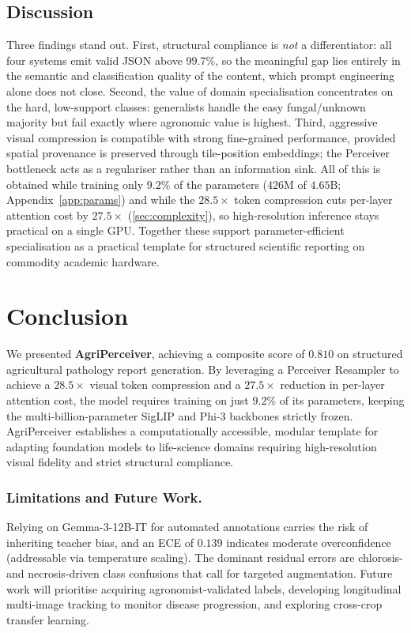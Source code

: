 \documentclass[runningheads]{llncs}
\newcommand{\ours}{AgriPerceiver}
\begin{document}
\subsection{Discussion}
Three findings stand out. First, structural compliance is \emph{not} a
differentiator: all four systems emit valid JSON above $99.7\%$, so the meaningful
gap lies entirely in the semantic and classification quality of the content, which
prompt engineering alone does not close. Second, the value of domain specialisation
concentrates on the hard, low-support classes: generalists handle the easy
fungal/unknown majority but fail exactly where agronomic value is highest.
Third, aggressive visual compression is compatible with strong fine-grained
performance, provided spatial provenance is preserved through tile-position
embeddings; the Perceiver bottleneck acts as a regulariser rather than an
information sink. All of this is obtained while training only $9.2\%$ of the
parameters ($426$M of $4.65$B; Appendix~\ref{app:params}) and while the $28.5\times$
token compression cuts per-layer attention cost by $27.5\times$
(\cref{sec:complexity}), so high-resolution inference stays practical on a
single GPU. Together these support parameter-efficient specialisation as a
practical template for structured scientific reporting on commodity academic
hardware.

\section{Conclusion}
\label{sec:conclusion}

We presented \textbf{\ours{}}, achieving a composite score of $\mathbf{0.810}$ on structured agricultural pathology report generation. By leveraging a Perceiver Resampler to achieve a $28.5{\times}$ visual token compression and a $27.5\times$ reduction in per-layer attention cost, the model requires training on just $9.2\%$ of its parameters, keeping the multi-billion-parameter SigLIP and Phi-3 backbones strictly frozen. \ours{} establishes a computationally accessible, modular template for adapting foundation models to life-science domains requiring high-resolution visual fidelity and strict structural compliance.

\subsubsection{Limitations and Future Work.}
Relying on Gemma-3-12B-IT for automated annotations carries the risk of inheriting teacher bias, and an ECE of $0.139$ indicates moderate overconfidence (addressable via temperature scaling). The dominant residual errors are chlorosis- and necrosis-driven class confusions that call for targeted augmentation. Future work will prioritise acquiring agronomist-validated labels, developing longitudinal multi-image tracking to monitor disease progression, and exploring cross-crop transfer learning.
\end{document}
